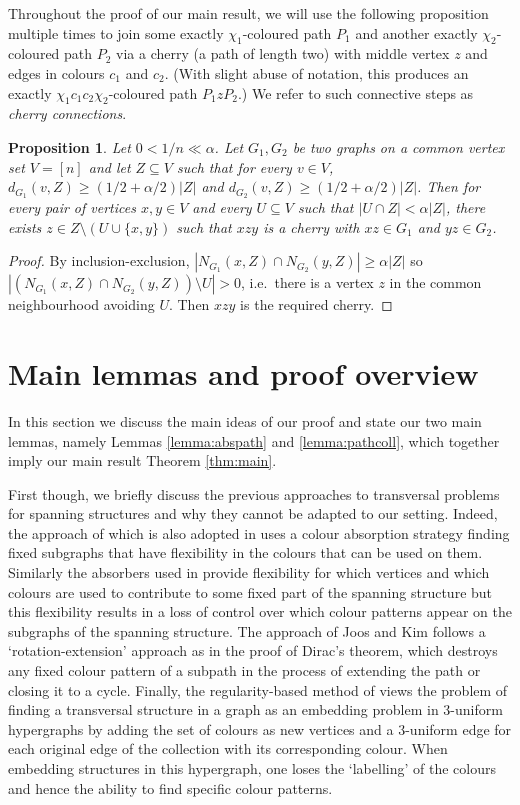 \documentclass[11pt, dvipsnames]{amsart}
\theoremstyle{plain}
\newtheorem{prop}[theo]{Proposition}
\theoremstyle{definition}
\newcommand{\sm}{\setminus}
\begin{document}
Throughout the proof of our main result, we will use the following proposition multiple times to join  some exactly $\chi_1$-coloured path $P_1$ and another exactly $\chi_2$-coloured path $P_2$ via a cherry (a path of length two) with middle vertex $z$ and edges in colours $c_1$ and $c_2$. (With slight abuse of notation, this produces an exactly  $\chi_1 c_1c_2\chi_2$-coloured path $P_1zP_2$.) We refer to such connective steps as \emph{cherry connections}.
\begin{prop}\label{prop:cherries}
Let $0 < 1/n \ll \alpha$.
Let $G_1,G_2$ be two graphs on a common vertex set $V=[n]$ and  let $Z\subseteq V$ such that for every $v\in V$, $ d_{G_1}(v,Z)\ge (1/2+\alpha/2)|Z|$ and $ d_{G_2}(v, Z)\ge (1/2+\alpha/2)|Z|$. Then for every pair of vertices $x, y \in V$ and every $U \subseteq V$ such that $|U\cap Z| <\alpha|Z|$, there exists $z \in Z \setminus (U \cup \{x,y\})$ such that $xzy$ is a cherry with $xz \in G_1$ and $yz \in G_2$. 
\end{prop}


\begin{proof}
    By inclusion-exclusion, $|N_{G_1}(x,Z)\cap N_{G_2}(y,Z)|\ge \alpha |Z|$ so $|(N_{G_1}(x,Z)\cap N_{G_2}(y,Z))\sm U|>0$, i.e.~there is a vertex $z$ in the common neighbourhood avoiding $U$. Then $xzy$ is the required cherry.
\end{proof}

\section{Main lemmas and proof overview}
\label{sec:proof overview}

In this section we discuss the main ideas of our proof and state our two main lemmas, namely Lemmas \ref{lemma:abspath} and \ref{lemma:pathcoll},  which together imply our main result Theorem \ref{thm:main}.

First though, we briefly discuss  the previous approaches to transversal problems for spanning structures and why they cannot be adapted to our setting. Indeed, the approach of \cite{mmp} which is also adopted in \cite{CIKL,chakraborti2023hamilton,ghmps} uses a colour absorption strategy finding fixed subgraphs that have flexibility in the colours that can be used on them. Similarly the absorbers used in \cite{Cheng2,chwwy,Cheng1} provide flexibility for which vertices and which colours are used to contribute to some fixed part of the spanning structure but this flexibility results in a loss of control over which  colour patterns appear on  the subgraphs of the spanning structure. The approach of Joos and Kim \cite{jooskim} follows a `rotation-extension' approach as in the proof of Dirac's theorem, which destroys any fixed colour pattern of a subpath in the process of extending the path or closing it to a cycle. Finally, the regularity-based method of \cite{staden_rainbow} views the problem of finding a transversal structure in a graph as an embedding problem in $3$-uniform hypergraphs by adding the set of colours as new vertices and a $3$-uniform edge for each original edge of the collection with its corresponding colour. When embedding structures in this hypergraph, one loses the `labelling' of the colours and hence the ability to find specific colour patterns. 
\end{document}
